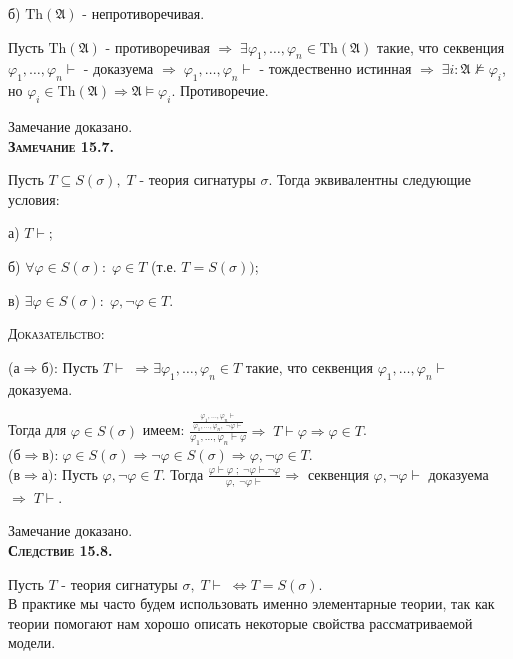 \documentclass[18pt, a4paper]{extarticle}
\newcommand{\vp}{\varphi}
\newcommand{\vd}{\vdash}
\begin{document}
б) $\text{Th}(\mathfrak{A})$ -  непротиворечивая.

Пусть $\text{Th}(\mathfrak{A})$ -  противоречивая $\Rightarrow\;\exists\vp_1,\dots,\vp_n\in \text{Th}(\mathfrak{A})$ такие, что секвенция $\vp_1,\dots,\vp_n\vd$ -  доказуема $\Rightarrow\;\vp_1,\dots,\vp_n\vd$ -  тождественно истинная $\Rightarrow\;\exists i:\mathfrak{A}\nvDash\vp_i$, но $\vp_i\in \text{Th}(\mathfrak{A})\Rightarrow\mathfrak{A}\vDash\vp_i$. Противоречие.

Замечание доказано.\\

\textbf{\textsc{Замечание 15.7.}} 

Пусть $T\subseteq S(\sigma),\;T$ - теория сигнатуры $\sigma$. Тогда эквивалентны следующие условия:

а) $T\vd$;

б) $\forall\vp\in S(\sigma):\;\vp\in T$ (т.е. $T=S(\sigma))$;

в) $\exists\vp\in S(\sigma):\;\vp,\lnot\vp\in T$.

\textsc{Доказательство:}

($\text{а}\Rightarrow \text{б})$: Пусть $T\vd\;\Rightarrow\exists\vp_1,\dots,\vp_n\in T$ такие, что секвенция $\vp_1,\dots,\vp_n\vd$ доказуема.

Тогда для $\vp\in S(\sigma)$ имеем: $\displaystyle \frac{\displaystyle \frac{\vp_1,\dots,\vp_n\vd}{\vp_1,\dots,\vp_n,\;\lnot\vp\vd}}{\vp_1,\dots,\vp_n\vd\vp}\Rightarrow\;T\vd\vp\Rightarrow\vp\in T$.\\

($\text{б}\Rightarrow \text{в})\text{:}\;\vp\in S(\sigma)\Rightarrow\lnot\vp\in S(\sigma)\Rightarrow\vp,\lnot\vp\in T$.\\

($\text{в}\Rightarrow \text{а})$: Пусть $\vp,\lnot\vp\in T$. Тогда $\displaystyle \frac{\vp\vd\vp\;;\;\lnot\vp\vd\lnot\vp}{\vp,\;\lnot\vp\vd}\Rightarrow$ секвенция $\vp,\lnot\vp\vd$ доказуема $\Rightarrow\;T\vd$.

Замечание доказано.\\

\textbf{\textsc{Следствие 15.8.}} 

Пусть $T$ -  теория сигнатуры $\sigma,\;T\vd\;\Leftrightarrow T=S(\sigma)$.\\

В практике мы часто будем использовать именно элементарные теории, так как теории помогают нам хорошо описать некоторые свойства рассматриваемой модели.\\
\end{document}
